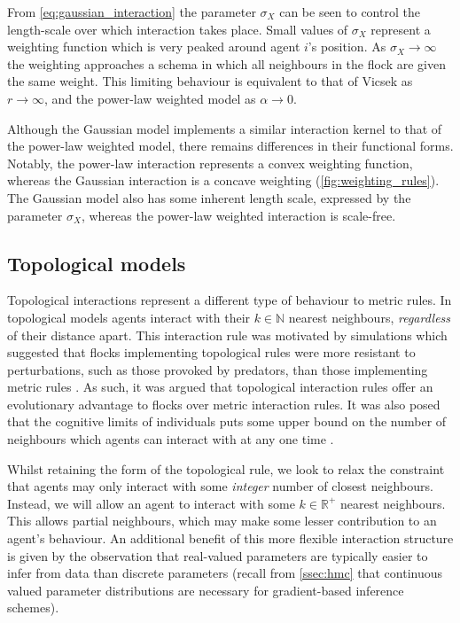 From \cref{eq:gaussian_interaction} the parameter $\sigma_X$ can be seen to
control the length-scale over which interaction takes place. Small values of
$\sigma_X$ represent a weighting function which is very peaked around agent
$i$'s position. As $\sigma_X \rightarrow \infty$ the weighting approaches a
schema in which all neighbours in the flock are given the same weight. This
limiting behaviour is equivalent to that of Vicsek as $r\rightarrow\infty$, and
the power-law weighted model as $\alpha\rightarrow0$.

Although the Gaussian model implements a similar interaction kernel to that of
the power-law weighted model, there remains differences in their functional
forms. Notably, the power-law interaction represents a convex weighting
function, whereas the Gaussian interaction is a concave weighting
(\cref{fig:weighting_rules}). The Gaussian model also has some inherent length
scale, expressed by the parameter $\sigma_X$, whereas the power-law weighted
interaction is scale-free.

\subsection{Topological models}

Topological interactions represent a different type of behaviour to metric
rules. In topological models agents interact with their $k\in\mathbb{N}$
nearest neighbours, \emph{regardless} of their distance apart. This interaction
rule was motivated by simulations which suggested that flocks implementing
topological rules were more resistant to perturbations, such as those provoked
by predators, than those implementing metric rules
\parencite{ballerini08,ginelli10,camperi12}. As such, it was argued that
topological interaction rules offer an evolutionary advantage to flocks over
metric interaction rules. It was also posed that the cognitive limits of
individuals puts some upper bound on the number of neighbours which agents can
interact with at any one time \parencite{nieder05,giardina08}.

Whilst retaining the form of the topological rule, we look to relax the
constraint that agents may only interact with some \emph{integer} number of
closest neighbours. Instead, we will allow an agent to interact with some
$k\in\mathbb{R}^+$ nearest neighbours. This allows partial neighbours, which
may make some lesser contribution to an agent's behaviour. An additional
benefit of this more flexible interaction structure is given by the observation
that real-valued parameters are typically easier to infer from data than
discrete parameters (recall from \cref{ssec:hmc} that continuous valued
parameter distributions are necessary for gradient-based inference schemes).

